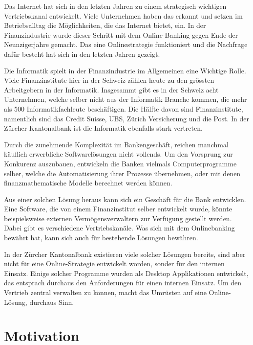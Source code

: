   Das Internet hat sich in den letzten Jahren zu einem strategisch wichtigen
  Vertriebskanal entwickelt. Viele Unternehmen haben das erkannt und setzen im
  Betriebsalltag die Möglichkeiten, die das Internet bietet, ein. In der
  Finanzindustrie wurde dieser Schritt mit dem Online-Banking gegen Ende der
  Neunzigerjahre gemacht. Das eine Onlinestrategie funktioniert und die
  Nachfrage dafür besteht hat sich in den letzten Jahren gezeigt.
  
  Die Informatik spielt in der Finanzindustrie im Allgemeinen eine Wichtige
  Rolle. Viele Finanzinstitute hier in der Schweiz zählen heute zu den grössten
  Arbeitgebern in der Informatik\cite{WoArbeitenInformatikfachleute}. Insgesammt
  gibt es in der Schweiz acht Unternehmen, welche selber nicht aus der
  Informatik Branche kommen, die mehr als 500 Informatikfachleute beschäftigen.
  Die Hälfte davon sind Finanzinstitute, namentlich sind das Credit Suisse,
  UBS, Zürich Versicherung und die Post. In der Zürcher Kantonalbank ist die
  Informatik ebenfalls stark vertreten.
  
  Durch die zunehmende Komplexität im Bankengeschäft, reichen manchmal käuflich
  erwerbliche Softwarelösungen nicht vollends. Um den Vorsprung zur Konkurenz
  auszubauen, entwickeln die Banken vielmals Computerprogramme selber, welche
  die Automatisierung ihrer Prozesse übernehmen, oder mit denen
  finanzmathematische Modelle berechnet werden können.
  
  Aus einer solchen Lösung heraus kann sich ein Geschäft für die Bank
  entwicklen. Eine Software, die von einem Finanzinstitut selber entwickelt
  wurde, könnte beispielsweise externen Vermögensverwaltern zur Verfügung
  gestellt werden. Dabei gibt es verschiedene Vertriebskanäle. Was sich mit dem
  Onlinebanking bewährt hat, kann sich auch für bestehende Lösungen bewähren.
  
  In der Zürcher Kantonalbank existieren viele solcher Lösungen bereits, sind
  aber nicht für eine Online-Strategie entwickelt worden, sonder für den
  internen Einsatz. Einige solcher Programme wurden als Desktop Applikationen
  entwickelt, das entsprach durchaus den Anforderungen für einen internen
  Einsatz. Um den Vertrieb zentral verwalten zu können, macht das Umrüsten
  auf eine Online-Lösung, durchaus Sinn.
  
  \section{Motivation}
  
